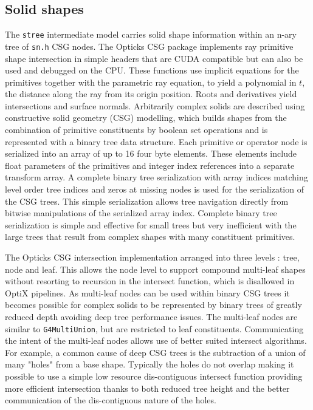 \documentclass{webofc}
\begin{document}
\subsection{Solid shapes}%
%
The {\tt stree} intermediate model carries solid shape information
within an n-ary tree of {\tt sn.h} CSG nodes. 
%
The Opticks CSG package implements ray primitive shape intersection in simple headers that 
are CUDA compatible but can also be used and debugged on the CPU.
These functions use implicit equations for the primitives together with 
the parametric ray equation, to yield a polynomial in $t$, the distance along the ray from its origin position. 
Roots and derivatives yield intersections and surface normals.
%
Arbitrarily complex solids are described using constructive solid geometry (CSG) modelling, 
which builds shapes from the combination of primitive constituents by boolean set operations
and is represented with a binary tree data structure.
%
Each primitive or operator node is serialized into an array of up to 16 four byte elements. 
These elements include float parameters of the primitives and integer index references 
into a separate transform array. 
A complete binary tree serialization with array indices matching level order tree indices
and zeros at missing nodes is used for the serialization of the CSG trees. This simple 
serialization allows tree navigation directly from bitwise manipulations of the serialized array index.
Complete binary tree serialization is simple and effective for small trees but very inefficient 
with the large trees that result from complex shapes with many constituent primitives. 

The Opticks CSG intersection implementation arranged into three levels : 
tree, node and leaf. This allows the node level to support compound 
multi-leaf shapes without resorting to recursion in the intersect function, which is disallowed in OptiX pipelines. 
As multi-leaf nodes can be used within binary CSG trees it becomes possible for complex solids to 
be represented by binary trees of greatly reduced depth avoiding deep tree performance issues.
The multi-leaf nodes are similar to {\tt G4MultiUnion}, but are restricted to leaf constituents.   
Communicating the intent of the multi-leaf nodes allows use of better suited intersect algorithms.
For example, a common cause of deep CSG trees is the subtraction of a union of many "holes" 
from a base shape. Typically the holes do not overlap making it possible to 
use a simple low resource dis-contiguous intersect function providing more efficient 
intersection thanks to both reduced tree height and the better communication of the 
dis-contiguous nature of the holes. 
%
%
\end{document}
